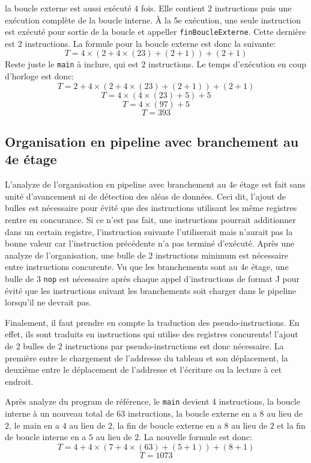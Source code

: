 \documentclass[a11paper]{article}
\newcommand{\todo}[1]{\begin{color}{Red}\textbf{TODO:} #1\end{color}}
\begin{document}
la boucle externe est aussi exécuté $4$ fois. Elle contient $2$ instructions puis une exécution complète de la boucle interne. À la 5e exécution, une seule instruction est exécuté
pour sortie de la boucle et appeller \verb|finBoucleExterne|. Cette dernière est $2$ instructions. La formule pour la boucle externe est donc la suivante:
$$
T = 4\times(2+4\times(23)+(2+1)) + (2+1)
$$
Reste juste le \verb|main| à inclure, qui est $2$ instructions. Le temps d'exécution en coup d'horloge est donc:
$$
T = 2+ 4\times(2+4\times(23)+(2+1)) + (2+1)
$$
$$
T = 4\times(4\times(23)+5) + 5
$$
$$
T = 4\times(97) + 5
$$
$$
T = 393
$$

\subsection{Organisation en pipeline avec branchement au 4e étage}
L'analyze de l'organisation en pipeline avec branchement au 4e étage est fait sans unité d'avancement ni de détection des aléas de données. Ceci dit, l'ajout de bulles est
nécessaire pour évité que des instructions utilisant les même registres rentre en concurance. Si ce n'est pas fait, une instructions pourrait additionner dans un certain registre, 
l'instruction suivante l'utiliserait mais n'aurait pas la bonne valeur car l'instruction précédente n'a pas terminé d'exécuté. Après une analyze de l'organisation, une bulle de $2$
instructions minimum est nécessaire entre instructions concurente. Vu que les branchements sont au 4e étage, une bulle de $3$ \verb|nop| est nécessaire après chaque appel
d'instructions de format J pour évité que les instructions suivant les branchements soit charger dans le pipeline lorsqu'il ne devrait pas.

Finalement, il faut prendre en compte la traduction des pseudo-instructions. En effet, ils sont traduits en instructions qui utilise des registres concurents! l'ajout de 2 bulles
de $2$ instructions par pseudo-instructions est donc nécessaire. La première entre le chargement de l'addresse du tableau et son déplacement, la deuxième entre le déplacement de
l'addresse et l'écriture ou la lecture à cet endroit.

Après analyze du program de référence, le \verb|main| devient 4 instructions, la boucle interne à un nouveau total de $63$ instructions, la boucle externe en a $8$ au lieu de $2$,
le main en a $4$ au lieu de $2$, la fin de boucle externe en a $8$ au lieu de $2$ et la fin de boucle interne en a $5$ au lieu de $2$.
La nouvelle formule est donc:
$$
T = 4+ 4\times(7+4\times(63)+(5+1)) + (8+1)
$$
$$
T = 1073
$$
\end{document}

